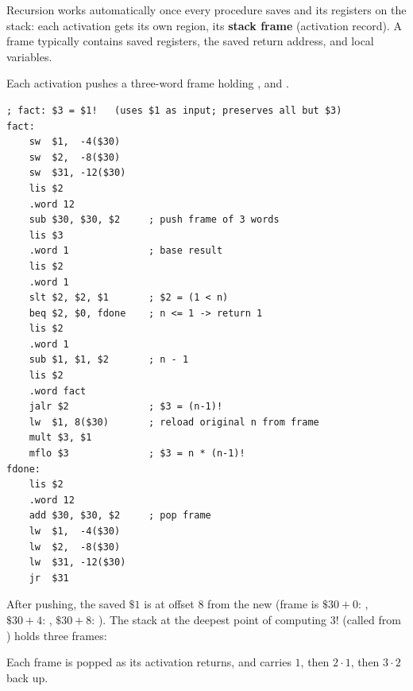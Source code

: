 Recursion works automatically once every procedure saves  and its registers on
the stack: each activation gets its own region, its \textbf{stack frame} (activation record).
A frame typically contains saved registers, the saved return address, and local variables.

\begin{example}
Each activation pushes a three-word frame holding ,  and .
\begin{lstlisting}[style=mips]
; fact: $3 = $1!   (uses $1 as input; preserves all but $3)
fact:
    sw  $1,  -4($30)
    sw  $2,  -8($30)
    sw  $31, -12($30)
    lis $2
    .word 12
    sub $30, $30, $2     ; push frame of 3 words
    lis $3
    .word 1              ; base result
    lis $2
    .word 1
    slt $2, $2, $1       ; $2 = (1 < n)
    beq $2, $0, fdone    ; n <= 1 -> return 1
    lis $2
    .word 1
    sub $1, $1, $2       ; n - 1
    lis $2
    .word fact
    jalr $2              ; $3 = (n-1)!
    lw  $1, 8($30)       ; reload original n from frame
    mult $3, $1
    mflo $3              ; $3 = n * (n-1)!
fdone:
    lis $2
    .word 12
    add $30, $30, $2     ; pop frame
    lw  $1,  -4($30)
    lw  $2,  -8($30)
    lw  $31, -12($30)
    jr  $31
\end{lstlisting}
After pushing, the saved $\$1$ is at offset 8 from the new  (frame is
$\$30{+}0$: , $\$30{+}4$: , $\$30{+}8$: ).
The stack at the deepest point of computing $3!$ (called from ) holds three frames:
\begin{center}
\end{center}
Each frame is popped as its activation returns, and  carries $1$, then $2\cdot1$, then $3\cdot2$ back up.
\end{example}

